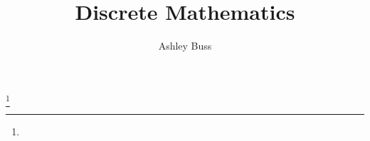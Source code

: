 \documentclass{amsart}
\theoremstyle{definition}
\theoremstyle{remark}
\numberwithin{equation}{section}
\begin{document}
\title{Discrete Mathematics}

\author{Ashley Buss}
\address{}
\curraddr{}
\email{}
\thanks{}







\maketitle

\end{document}
